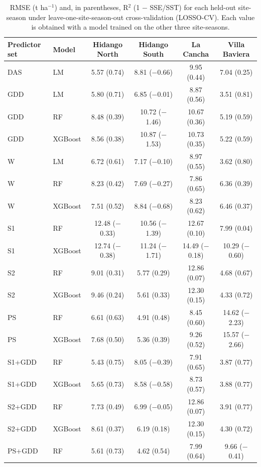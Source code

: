 \begin{table}[htbp]
\centering
\footnotesize
\caption{RMSE (t ha$^{-1}$) and, in parentheses, R$^2$ (1 $-$ SSE/SST) for each held-out site-season under leave-one-site-season-out cross-validation (LOSSO-CV). Each value is obtained with a model trained on the other three site-seasons.}
\label{tbl-s2}
\begin{tabular}{l l c c c c}
\toprule
\textbf{Predictor set} & \textbf{Model} & \textbf{Hidango North} & \textbf{Hidango South} & \textbf{La Cancha} & \textbf{Villa Baviera} \\
\midrule
DAS & LM & 5.57 (0.74) & 8.81 ($-$0.66) & 9.95 (0.44) & 7.04 (0.25) \\
GDD & LM & 5.80 (0.71) & 6.85 ($-$0.01) & 8.87 (0.56) & 3.51 (0.81) \\
GDD & RF & 8.48 (0.39) & 10.72 ($-$1.46) & 10.67 (0.36) & 5.19 (0.59) \\
GDD & XGBoost & 8.56 (0.38) & 10.87 ($-$1.53) & 10.73 (0.35) & 5.22 (0.59) \\
W & LM & 6.72 (0.61) & 7.17 ($-$0.10) & 8.97 (0.55) & 3.62 (0.80) \\
W & RF & 8.23 (0.42) & 7.69 ($-$0.27) & 7.86 (0.65) & 6.36 (0.39) \\
W & XGBoost & 7.51 (0.52) & 8.84 ($-$0.68) & 8.23 (0.62) & 6.46 (0.37) \\
S1 & RF & 12.48 ($-$0.33) & 10.56 ($-$1.39) & 12.67 (0.10) & 7.99 (0.04) \\
S1 & XGBoost & 12.74 ($-$0.38) & 11.24 ($-$1.71) & 14.49 ($-$0.18) & 10.29 ($-$0.60) \\
S2 & RF & 9.01 (0.31) & 5.77 (0.29) & 12.86 (0.07) & 4.68 (0.67) \\
S2 & XGBoost & 9.46 (0.24) & 5.61 (0.33) & 12.30 (0.15) & 4.33 (0.72) \\
PS & RF & 6.61 (0.63) & 4.91 (0.48) & 8.45 (0.60) & 14.62 ($-$2.23) \\
PS & XGBoost & 7.68 (0.50) & 5.36 (0.39) & 9.26 (0.52) & 15.57 ($-$2.66) \\
S1+GDD & RF & 5.43 (0.75) & 8.05 ($-$0.39) & 7.91 (0.65) & 3.87 (0.77) \\
S1+GDD & XGBoost & 5.65 (0.73) & 8.58 ($-$0.58) & 8.73 (0.57) & 3.88 (0.77) \\
S2+GDD & RF & 7.73 (0.49) & 6.99 ($-$0.05) & 12.86 (0.07) & 3.91 (0.77) \\
S2+GDD & XGBoost & 8.61 (0.37) & 6.19 (0.18) & 12.30 (0.15) & 4.30 (0.72) \\
PS+GDD & RF & 5.61 (0.73) & 4.62 (0.54) & 7.99 (0.64) & 9.66 ($-$0.41) \\

\end{tabular}
\end{table}
